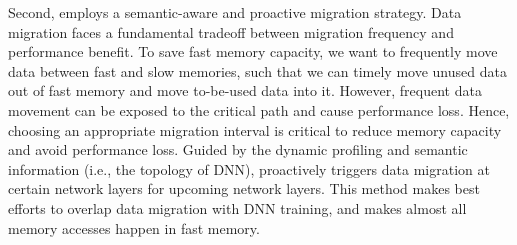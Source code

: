 

\textcolor{check}{Second, \name employs a semantic-aware and proactive migration strategy. Data migration faces a fundamental tradeoff between migration frequency and performance benefit. %
To save fast memory capacity, 
we want to frequently move data between fast and slow memories, such that we can timely move unused data out of fast memory and move to-be-used data into it. However, frequent data movement can be exposed to the critical path and cause performance loss. Hence, choosing an appropriate migration interval is critical to reduce memory capacity and avoid performance loss. Guided by the dynamic profiling and semantic information (i.e., the topology of DNN), \name proactively triggers data migration at certain network layers for upcoming network layers. This method makes best efforts to overlap data migration with DNN training, and makes almost all memory accesses happen in fast memory.} 



